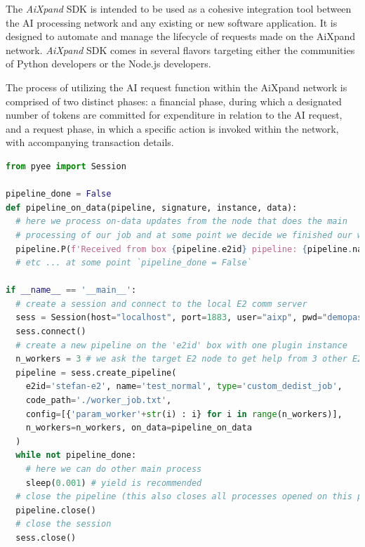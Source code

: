 \documentclass{article}
\begin{document}
The \textit{AiXpand} SDK is intended to be used as a cohesive integration tool between the AI processing network and any existing or new software application. It is designed to automate and manage the lifecycle of requests made on the AiXpand network. \textit{AiXpand} SDK comes in several flavors targeting either the communities of Python developers or the Node.js developers.

The process of utilizing the AI request function within the AiXpand network is comprised of two distinct phases: a financial phase, during which a designated number of tokens are committed for expenditure in relation to the AI request, and a request phase, in which a specific action is invoked within the network, with accompanying transaction details.

\begin{lstlisting}[language=Python, caption={A simple Python example based on PyEE package where we use our own local node to distribute a job. The main pipeline will perform basic aggregation of worker progress data and the client can consume the results asynchronously. \textit{Please note that this is a orientative example as the PyEE package is still in early phase and new methods and subpackages are being added}}, label={lst:pyee}]
from pyee import Session

pipeline_done = False
def pipeline_on_data(pipeline, signature, instance, data):
  # here we process on-data updates from the node that does the main
  # processing of our job and at some point we decide we finished our work
  pipeline.P(f'Received from box {pipeline.e2id} pipeline: {pipeline.name}:{signature}:{instance}')
  # etc ... at some point `pipeline_done = False`

if __name__ == '__main__':
  # create a session and connect to the local E2 comm server
  sess = Session(host="localhost", port=1883, user="aixp", pwd="demopass")
  sess.connect()
  # create a new pipeline on the 'e2id' box with one plugin instance
  n_workers = 3 # we ask the target E2 node to get help from 3 other E2s
  pipeline = sess.create_pipeline(
    e2id='stefan-e2', name='test_normal', type='custom_dedist_job', 
    code_path='./worker_job.txt', 
    config=[{'param_worker'+str(i) : i} for i in range(n_workers)],
    n_workers=n_workers, on_data=pipeline_on_data
  )
  while not pipeline_done:
    # here we can do other main process 
    sleep(0.001) # yield is recommended  
  # close the pipeline (this also closes all processes opened on this pipeline)
  pipeline.close()
  # close the session
  sess.close()
\end{lstlisting}
\end{document}
